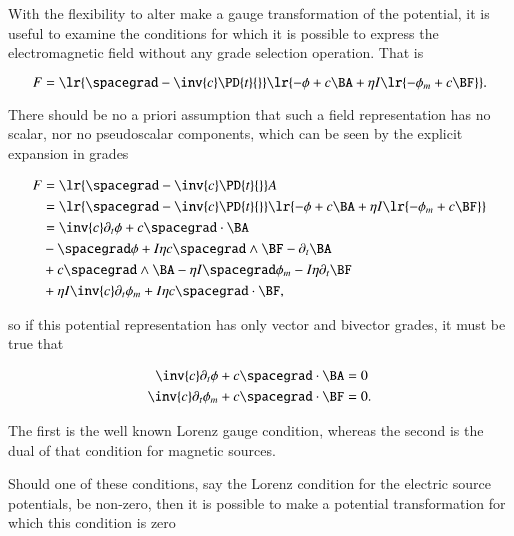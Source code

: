 
With the flexibility to alter make a gauge transformation of the potential, it is useful to examine the conditions for which it is possible to express the electromagnetic field without any grade selection operation.
That is

\begin{dmath}\label{eqn:potentialSection_LorenzGauge:1720}
F
=
\lr{ \spacegrad - \inv{c} \PD{t}{} }
\lr{
      - \phi
      + c \BA
      + \eta I \lr{ -\phi_m + c \BF }
}.
\end{dmath}

There should be no a priori assumption that such a field representation has no scalar, nor no pseudoscalar components, which can be seen by the explicit expansion in grades

\begin{dmath}\label{eqn:potentialSection_LorenzGauge:1640}
\begin{aligned}
F
&=
\lr{ \spacegrad - \inv{c} \PD{t}{} } A \\
&=
\lr{ \spacegrad - \inv{c} \PD{t}{} } \lr{ -\phi + c \BA + \eta I \lr{ -\phi_m + c \BF } } \\
&=
\inv{c} \partial_t \phi
+ c \spacegrad \cdot \BA  \\
&-\spacegrad \phi
+ I \eta c \spacegrad \wedge \BF
- \partial_t \BA  \\
&+ c \spacegrad \wedge \BA
- \eta I \spacegrad \phi_m
- I \eta \partial_t \BF \\
&+ \eta I \inv{c} \partial_t \phi_m
+ I \eta c \spacegrad \cdot \BF,
\end{aligned}
\end{dmath}

so if this potential representation has only vector and bivector grades, it must be true that

\begin{dmath}\label{eqn:potentialSection_LorenzGauge:1660}
\begin{aligned}
\inv{c} \partial_t \phi + c \spacegrad \cdot \BA &= 0 \\
\inv{c} \partial_t \phi_m + c \spacegrad \cdot \BF &= 0.
\end{aligned}
\end{dmath}

The first is the well known Lorenz gauge condition, whereas the second is the dual of that condition for magnetic sources.

Should one of these conditions, say the Lorenz condition for the electric source potentials, be non-zero, then it is possible to make a potential transformation for which this condition is zero


